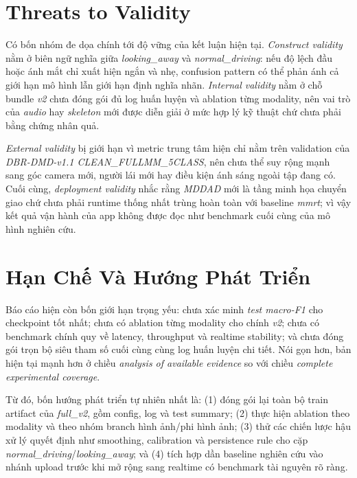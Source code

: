\documentclass[conference,a4paper]{IEEEtran}
\begin{document}
\section[Threats To Validity]{Threats to Validity}
Có bốn nhóm đe dọa chính tới độ vững của kết luận hiện tại. \textit{Construct validity} nằm ở biên ngữ nghĩa giữa \textit{looking\_away} và \textit{normal\_driving}: nếu độ lệch đầu hoặc ánh mắt chỉ xuất hiện ngắn và nhẹ, confusion pattern có thể phản ánh cả giới hạn mô hình lẫn giới hạn định nghĩa nhãn. \textit{Internal validity} nằm ở chỗ bundle \textit{v2} chưa đóng gói đủ log huấn luyện và ablation từng modality, nên vai trò của \textit{audio} hay \textit{skeleton} mới được diễn giải ở mức hợp lý kỹ thuật chứ chưa phải bằng chứng nhân quả.

\textit{External validity} bị giới hạn vì metric trung tâm hiện chỉ nằm trên validation của \textit{DBR-DMD-v1.1 CLEAN\_FULLMM\_5CLASS}, nên chưa thể suy rộng mạnh sang góc camera mới, người lái mới hay điều kiện ánh sáng ngoài tập đang có. Cuối cùng, \textit{deployment validity} nhắc rằng \textit{MDDAD} mới là tầng minh họa chuyển giao chứ chưa phải runtime thống nhất trùng hoàn toàn với baseline \textit{mmrt}; vì vậy kết quả vận hành của app không được đọc như benchmark cuối cùng của mô hình nghiên cứu.

\section[Han Che Va Huong Phat Trien]{Hạn Chế Và Hướng Phát Triển}
Báo cáo hiện còn bốn giới hạn trọng yếu: chưa xác minh \textit{test macro-F1} cho checkpoint tốt nhất; chưa có ablation từng modality cho chính \textit{v2}; chưa có benchmark chính quy về latency, throughput và realtime stability; và chưa đóng gói trọn bộ siêu tham số cuối cùng cùng log huấn luyện chi tiết. Nói gọn hơn, bản hiện tại mạnh hơn ở chiều \textit{analysis of available evidence} so với chiều \textit{complete experimental coverage}.

Từ đó, bốn hướng phát triển tự nhiên nhất là: (1) đóng gói lại toàn bộ train artifact của \textit{full\_v2}, gồm config, log và test summary; (2) thực hiện ablation theo modality và theo nhóm branch hình ảnh/phi hình ảnh; (3) thử các chiến lược hậu xử lý quyết định như smoothing, calibration và persistence rule cho cặp \textit{normal\_driving}/\textit{looking\_away}; và (4) tích hợp dần baseline nghiên cứu vào nhánh upload trước khi mở rộng sang realtime có benchmark tài nguyên rõ ràng.
\end{document}

